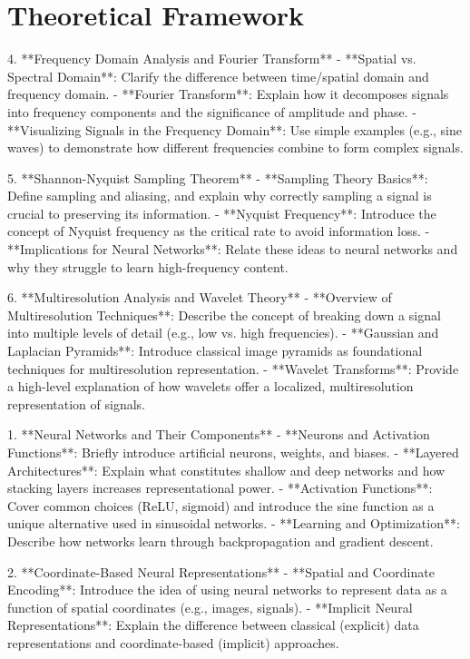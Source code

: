 \chapter{Theoretical Framework}

 4. **Frequency Domain Analysis and Fourier Transform**
   - **Spatial vs. Spectral Domain**: Clarify the difference between time/spatial domain and frequency domain.
   - **Fourier Transform**: Explain how it decomposes signals into frequency components and the significance of amplitude and phase.
   - **Visualizing Signals in the Frequency Domain**: Use simple examples (e.g., sine waves) to demonstrate how different frequencies combine to form complex signals.

 5. **Shannon-Nyquist Sampling Theorem**
   - **Sampling Theory Basics**: Define sampling and aliasing, and explain why correctly sampling a signal is crucial to preserving its information.
   - **Nyquist Frequency**: Introduce the concept of Nyquist frequency as the critical rate to avoid information loss.
   - **Implications for Neural Networks**: Relate these ideas to neural networks and why they struggle to learn high-frequency content.

 6. **Multiresolution Analysis and Wavelet Theory**
   - **Overview of Multiresolution Techniques**: Describe the concept of breaking down a signal into multiple levels of detail (e.g., low vs. high frequencies).
   - **Gaussian and Laplacian Pyramids**: Introduce classical image pyramids as foundational techniques for multiresolution representation.
   - **Wavelet Transforms**: Provide a high-level explanation of how wavelets offer a localized, multiresolution representation of signals.


 1. **Neural Networks and Their Components**
   - **Neurons and Activation Functions**: Briefly introduce artificial neurons, weights, and biases.
   - **Layered Architectures**: Explain what constitutes shallow and deep networks and how stacking layers increases representational power.
   - **Activation Functions**: Cover common choices (ReLU, sigmoid) and introduce the sine function as a unique alternative used in sinusoidal networks.
   - **Learning and Optimization**: Describe how networks learn through backpropagation and gradient descent.

 2. **Coordinate-Based Neural Representations**
   - **Spatial and Coordinate Encoding**: Introduce the idea of using neural networks to represent data as a function of spatial coordinates (e.g., images, signals).
   - **Implicit Neural Representations**: Explain the difference between classical (explicit) data representations and coordinate-based (implicit) approaches.

